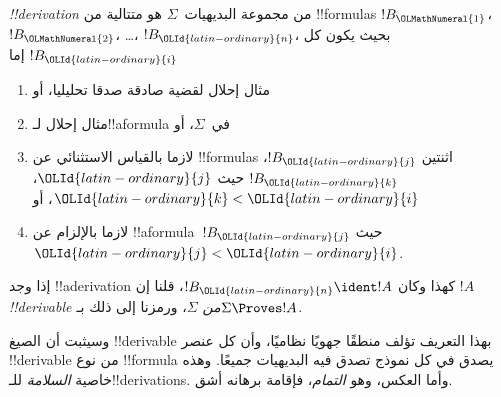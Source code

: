 \documentclass[../../../include/open-logic-section]{subfiles}
\begin{document}
\begin{defn}
\emph{!!{derivation}} من مجموعة البديهيات~$\Sigma$ هو متتالية من
!!{formula}s $!B_\OLMathNumeral{1}$، $!B_\OLMathNumeral{2}$، \dots، $!B_\OLId{latin-ordinary}{n}$، بحيث يكون كل $!B_\OLId{latin-ordinary}{i}$ إما
\begin{enumerate}
\item مثال إحلال لقضية صادقة صدقا تحليليا، أو
\item مثال إحلال لـ!!a{formula} في~$\Sigma$، أو
\item لازما بالقياس الاستثنائي عن !!{formula}s اثنتين $!B_\OLId{latin-ordinary}{j}$، $!B_\OLId{latin-ordinary}{k}$
  حيث $\OLId{latin-ordinary}{j}$، $\OLId{latin-ordinary}{k} < \OLId{latin-ordinary}{i}$، أو
\item لازما بالإلزام عن !!a{formula}~$!B_\OLId{latin-ordinary}{j}$ حيث $\OLId{latin-ordinary}{j} < \OLId{latin-ordinary}{i}$.
\end{enumerate}
إذا وجد !!a{derivation} كهذا وكان $!B_\OLId{latin-ordinary}{n} \ident !A$، قلنا إن
$!A$ \emph{!!{derivable} من $\Sigma$}، ورمزنا إلى ذلك بـ$\Sigma \Proves !A$.
\end{defn}

وسيثبت أن الصيغ !!{derivable} بهذا التعريف تؤلف منطقًا جهويًا
نظاميًا، وأن كل عنصر !!{derivable} من نوع !!{formula} يصدق
في كل نموذج تصدق فيه البديهيات جميعًا. وهذه خاصية
\emph{السلامة} للـ!!{derivation}s. وأما العكس، وهو
\emph{التمام}، فإقامة برهانه أشق.
\end{document}
